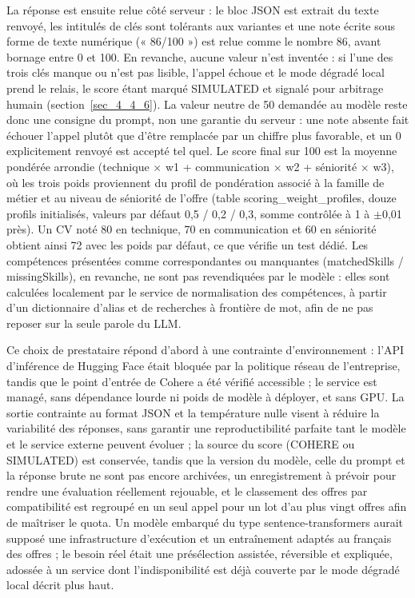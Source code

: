 La réponse est ensuite relue côté serveur : le bloc JSON est extrait du texte renvoyé, les intitulés de clés sont tolérants aux variantes et une note écrite sous forme de texte numérique (« 86/100 ») est relue comme le nombre 86, avant bornage entre 0 et 100. En revanche, aucune valeur n’est inventée : si l’une des trois clés manque ou n’est pas lisible, l’appel échoue et le mode dégradé local prend le relais, le score étant marqué SIMULATED et signalé pour arbitrage humain (section~\ref{sec_4_4_6}). La valeur neutre de 50 demandée au modèle reste donc une consigne du prompt, non une garantie du serveur : une note absente fait échouer l’appel plutôt que d’être remplacée par un chiffre plus favorable, et un 0 explicitement renvoyé est accepté tel quel. Le score final sur 100 est la moyenne pondérée arrondie (technique $\times$ w1 + communication $\times$ w2 + séniorité $\times$ w3), où les trois poids proviennent du profil de pondération associé à la famille de métier et au niveau de séniorité de l’offre (table scoring\_weight\_profiles, douze profils initialisés, valeurs par défaut 0,5 / 0,2 / 0,3, somme contrôlée à 1 à $\pm$0,01 près). Un CV noté 80 en technique, 70 en communication et 60 en séniorité obtient ainsi 72 avec les poids par défaut, ce que vérifie un test dédié. Les compétences présentées comme correspondantes ou manquantes (matchedSkills / missingSkills), en revanche, ne sont pas revendiquées par le modèle : elles sont calculées localement par le service de normalisation des compétences, à partir d’un dictionnaire d’alias et de recherches à frontière de mot, afin de ne pas reposer sur la seule parole du LLM.

Ce choix de prestataire répond d’abord à une contrainte d’environnement : l’API d’inférence de Hugging Face était bloquée par la politique réseau de l’entreprise, tandis que le point d’entrée de Cohere a été vérifié accessible ; le service est managé, sans dépendance lourde ni poids de modèle à déployer, et sans GPU. La sortie contrainte au format JSON et la température nulle visent à réduire la variabilité des réponses, sans garantir une reproductibilité parfaite tant le modèle et le service externe peuvent évoluer ; la source du score (COHERE ou SIMULATED) est conservée, tandis que la version du modèle, celle du prompt et la réponse brute ne sont pas encore archivées, un enregistrement à prévoir pour rendre une évaluation réellement rejouable, et le classement des offres par compatibilité est regroupé en un seul appel pour un lot d’au plus vingt offres afin de maîtriser le quota. Un modèle embarqué du type sentence-transformers aurait supposé une infrastructure d’exécution et un entraînement adaptés au français des offres ; le besoin réel était une présélection assistée, réversible et expliquée, adossée à un service dont l’indisponibilité est déjà couverte par le mode dégradé local décrit plus haut.


